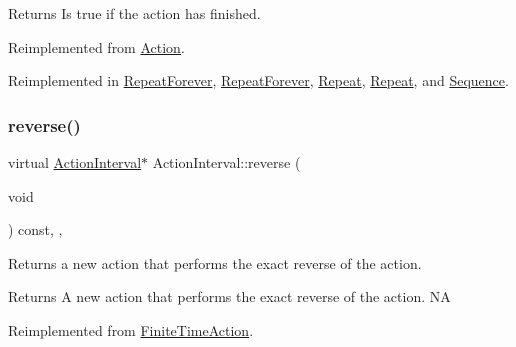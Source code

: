 \begin{DoxyReturn}{Returns}
Is true if the action has finished. 
\end{DoxyReturn}


Reimplemented from \hyperlink{classAction_a9b5dd627540a85f89f3e82acd46b7772}{Action}.



Reimplemented in \hyperlink{classRepeatForever_a5bae9a12b19d0c39d2a8a416bc68b1db}{Repeat\+Forever}, \hyperlink{classRepeatForever_a373f8961c015a1afa61c293ce787382c}{Repeat\+Forever}, \hyperlink{classRepeat_a2efd4a590fb52dbc862b1e086509b87a}{Repeat}, \hyperlink{classRepeat_a01f8323eda5c46d6f103e8f8c5027f30}{Repeat}, and \hyperlink{classSequence_a2f331fff9e2ab6e63569f55615a1c03e}{Sequence}.

\mbox{\label{classActionInterval_a9f9ac7164036a0bc261a72f62a2b2da7}} 
\subsubsection{\texorpdfstring{reverse()}{reverse()}\hspace{0.1cm}{\footnotesize\ttfamily [1/2]}}
{\footnotesize\ttfamily virtual \hyperlink{classActionInterval}{Action\+Interval}$\ast$ Action\+Interval\+::reverse (\begin{DoxyParamCaption}\item[{void}]{ }\end{DoxyParamCaption}) const\hspace{0.3cm}{\ttfamily [inline]}, {\ttfamily [override]}, {\ttfamily [virtual]}}

Returns a new action that performs the exact reverse of the action.

\begin{DoxyReturn}{Returns}
A new action that performs the exact reverse of the action.  NA 
\end{DoxyReturn}


Reimplemented from \hyperlink{classFiniteTimeAction_a886bbdd2dc82167fe6ffae664c22dacc}{Finite\+Time\+Action}.



